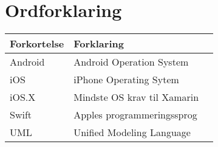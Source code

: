 \chapter*{Ordforklaring}

\begin{tabularx}{\textwidth}{l l X} \hline
	\textbf{Forkortelse}  & \textbf{Forklaring} \\ \hline
	Android& Android Operation System& \\
	iOS&  iPhone Operating Sytem& \\
	iOS.X& Mindste OS krav til Xamarin \\
	Swift& Apples programmeringssprog& \\
	UML& Unified Modeling Language& \\
	
\end{tabularx}